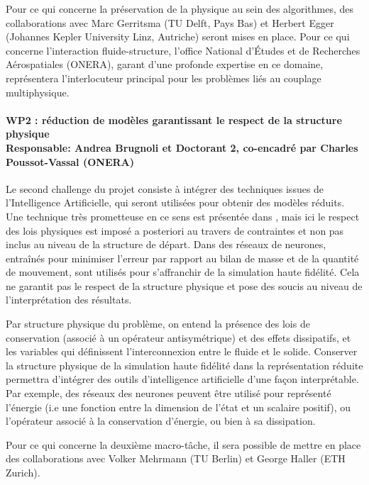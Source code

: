 \documentclass[12pt, french]{article}
\begin{document}
Pour ce qui concerne la préservation de la physique au sein des algorithmes, des collaborations avec Marc Gerritsma (TU Delft, Pays Bas) et Herbert Egger (Johannes Kepler University Linz, Autriche) seront mises en place. Pour ce qui concerne l'interaction fluide-structure, l'office National d'Études et de Recherches Aérospatiales (ONERA), garant d'une profonde expertise en ce domaine, représentera l'interlocuteur principal pour les problèmes liés au couplage multiphysique.

\paragraph{\large WP2 : réduction de modèles garantissant le respect de la structure physique\\
Responsable: Andrea Brugnoli et Doctorant 2, co-encadré par Charles Poussot-Vassal (ONERA)\\}

Le second challenge du projet consiste à intégrer des techniques issues de l'Intelligence
Artificielle, qui seront utilisées pour obtenir des modèles réduits. Une technique très prometteuse en ce sens est présentée dans \cite{lee2020}, mais ici le respect des lois physiques est imposé a posteriori au travers de contraintes et non pas inclus au niveau de la structure de départ. Dans \cite{sun2020physics} des réseaux de neurones, entraînés pour minimiser l'erreur par rapport au bilan de masse et de la quantité de mouvement, sont utilisés pour s'affranchir de la simulation haute fidélité. Cela ne garantit pas le respect de la structure physique et pose des soucis au niveau de l'interprétation des résultats.

Par structure physique du problème, on entend la présence des lois de conservation (associé à un opérateur antisymétrique) et des effets dissipatifs, et les variables qui définissent l'interconnexion entre le fluide et le solide. Conserver la structure physique de la simulation haute fidélité dans la représentation réduite permettra d'intégrer des outils d'intelligence artificielle d'une façon interprétable. Par exemple, des réseaux des neurones peuvent être utilisé pour représenté l'énergie (i.e une fonction entre la dimension de l'état et un scalaire positif), ou l'opérateur associé à la conservation d'énergie, ou bien à sa dissipation. 

Pour ce qui concerne la deuxième macro-tâche, il sera possible de mettre en place des collaborations avec Volker Mehrmann (TU Berlin) et George Haller (ETH Zurich).
\end{document}
